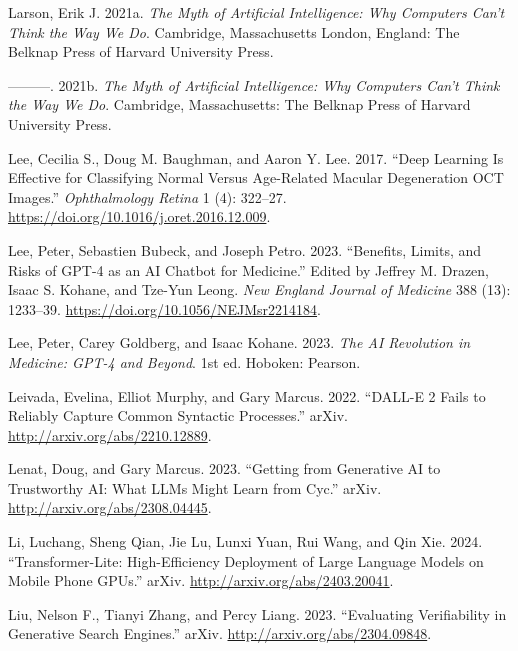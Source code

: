 \documentclass[
  Letterpaper,
]{scrbook}
\newlength{\cslhangindent}
\newenvironment{CSLReferences}[2] %
 {\begin{list}{}{%
  \setlength{\itemindent}{0pt}
  \setlength{\leftmargin}{0pt}
  \setlength{\parsep}{0pt}
  \ifodd #1
   \setlength{\leftmargin}{\cslhangindent}
   \setlength{\itemindent}{-1\cslhangindent}
  \fi
  \setlength{\itemsep}{#2\baselineskip}}}
 {\end{list}}
\begin{document}
\begin{CSLReferences}{1}{0}
Larson, Erik J. 2021a. \emph{The Myth of Artificial Intelligence: Why
Computers Can't Think the Way We Do}. Cambridge, Massachusetts London,
England: The Belknap Press of Harvard University Press.

---------. 2021b. \emph{The Myth of Artificial Intelligence: Why
Computers Can't Think the Way We Do}. Cambridge, Massachusetts: The
Belknap Press of Harvard University Press.

Lee, Cecilia S., Doug M. Baughman, and Aaron Y. Lee. 2017. {``Deep
{Learning} {Is} {Effective} for {Classifying} {Normal} Versus
{Age}-{Related} {Macular} {Degeneration} {OCT} {Images}.''}
\emph{Ophthalmology Retina} 1 (4): 322--27.
\url{https://doi.org/10.1016/j.oret.2016.12.009}.

Lee, Peter, Sebastien Bubeck, and Joseph Petro. 2023. {``Benefits,
{Limits}, and {Risks} of {GPT}-4 as an {AI} {Chatbot} for {Medicine}.''}
Edited by Jeffrey M. Drazen, Isaac S. Kohane, and Tze-Yun Leong.
\emph{New England Journal of Medicine} 388 (13): 1233--39.
\url{https://doi.org/10.1056/NEJMsr2214184}.

Lee, Peter, Carey Goldberg, and Isaac Kohane. 2023. \emph{The {AI}
Revolution in Medicine: {GPT}-4 and Beyond}. 1st ed. Hoboken: Pearson.

Leivada, Evelina, Elliot Murphy, and Gary Marcus. 2022. {``{DALL}-{E} 2
{Fails} to {Reliably} {Capture} {Common} {Syntactic} {Processes}.''}
arXiv. \url{http://arxiv.org/abs/2210.12889}.

Lenat, Doug, and Gary Marcus. 2023. {``Getting from {Generative} {AI} to
{Trustworthy} {AI}: {What} {LLMs} Might Learn from {Cyc}.''} arXiv.
\url{http://arxiv.org/abs/2308.04445}.

Li, Luchang, Sheng Qian, Jie Lu, Lunxi Yuan, Rui Wang, and Qin Xie.
2024. {``Transformer-{Lite}: {High}-Efficiency {Deployment} of {Large}
{Language} {Models} on {Mobile} {Phone} {GPUs}.''} arXiv.
\url{http://arxiv.org/abs/2403.20041}.

Liu, Nelson F., Tianyi Zhang, and Percy Liang. 2023. {``Evaluating
{Verifiability} in {Generative} {Search} {Engines}.''} arXiv.
\url{http://arxiv.org/abs/2304.09848}.


\end{CSLReferences}
\end{document}
